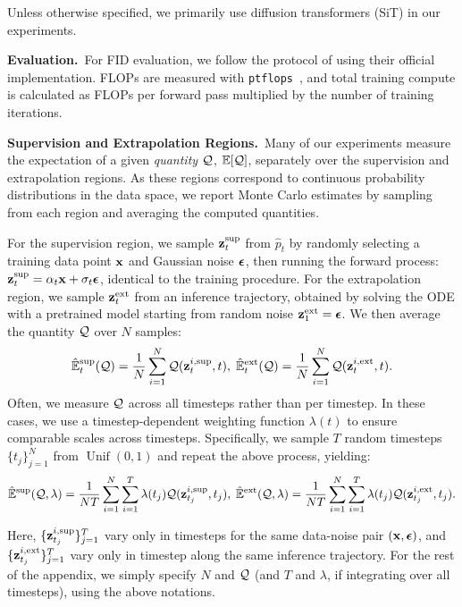 Unless otherwise specified, we primarily use diffusion transformers (SiT) in our experiments.

\textbf{Evaluation.}~For FID evaluation, we follow the protocol of \citet{dhariwal2021diffusion} using their official implementation. FLOPs are measured with \texttt{ptflops}~\citep{ptflops}, and total training compute is calculated as FLOPs per forward pass multiplied by the number of training iterations.

\textbf{Supervision and Extrapolation Regions.}~Many of our experiments measure the expectation of a given \emph{quantity ${\mathcal{Q}}$}, $\mathbb{E}[{\mathcal{Q}}]$, separately over the supervision and extrapolation regions. As these regions correspond to continuous probability distributions in the data space, we report Monte Carlo estimates by sampling from each region and averaging the computed quantities.

For the supervision region, we sample ${\mathbf{z}}_t^{\text{sup}}$ from $\hat{p}_t$ by randomly selecting a training data point ${\mathbf{x}}$ and Gaussian noise ${\boldsymbol{\epsilon}}$, then running the forward process: ${\mathbf{z}}_t^\text{sup} = \alpha_t {\mathbf{x}} + \sigma_t {\boldsymbol{\epsilon}}$, identical to the training procedure. For the extrapolation region, we sample ${\mathbf{z}}_t^\text{ext}$ from an inference trajectory, obtained by solving the ODE with a pretrained model starting from random noise ${\mathbf{z}}_1^\text{ext} = {\boldsymbol{\epsilon}}$. We then average the quantity ${\mathcal{Q}}$ over $N$ samples:
$$\hat{\mathbb{E}}_t^{\text{sup}} ({\mathcal{Q}}) = \frac{1}{N}\sum_{i = 1}^{N} {\mathcal{Q}}({\mathbf{z}}_t^{i,\text{sup}}, t), \;\hat{\mathbb{E}}_t^{\text{ext}} ({\mathcal{Q}}) = \frac{1}{N}\sum_{i = 1}^{N} {\mathcal{Q}}({\mathbf{z}}_t^{i,\text{ext}}, t).$$
Often, we measure ${\mathcal{Q}}$ across all timesteps rather than per timestep. In these cases, we use a timestep-dependent weighting function $\lambda(t)$ to ensure comparable scales across timesteps. Specifically, we sample $T$ random timesteps $\{t_j\}_{j=1}^{N}$ from $\operatorname{Unif}(0, 1)$ and repeat the above process, yielding:
$$\hat{\mathbb{E}}^\text{sup}({\mathcal{Q}}, \lambda) = \frac{1}{NT}\sum_{i=1}^N\sum_{i=1}^T \lambda(t_j) {\mathcal{Q}}({\mathbf{z}}_{t_j}^{i,\text{sup}}, t_j),\;\hat{\mathbb{E}}^\text{ext}({\mathcal{Q}}, \lambda) = \frac{1}{NT}\sum_{i=1}^N\sum_{i=1}^T  \lambda(t_j) {\mathcal{Q}}({\mathbf{z}}_{t_j}^{i,\text{ext}}, t_j).$$

Here, $\{{\mathbf{z}}_{t_j}^{i,\text{sup}}\}_{j=1}^T$ vary only in timesteps for the same data-noise pair $({\mathbf{x}}, {\boldsymbol{\epsilon}})$, and $\{{\mathbf{z}}_{t_j}^{i,\text{ext}}\}_{j=1}^T$ vary only in timestep along the same inference trajectory. For the rest of the appendix, we simply specify $N$ and ${\mathcal{Q}}$ (and $T$ and $\lambda$, if integrating over all timesteps), using the above notations.

